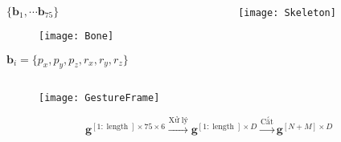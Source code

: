 \begin{frame}
	\begin{columns}
		\begin{column}{0.6\textwidth}
			\centering
			{\Large
			$\{ \mathbf{b}_1, \cdots \mathbf{b}_{75} \}$}
			\vspace{10pt}
			
			\begin{figure}[H]
				\centering
				\texttt{[image: Bone]}
			\end{figure}
			
			\vspace{10pt}
			{\Large
				$\mathbf{b}_{i} = \{p_x, p_y, p_z, r_x, r_y, r_z\}$}
		\end{column}
		
		\begin{column}{0.4\textwidth}
			\begin{figure}[h]
				\centering
				\texttt{[image: Skeleton]}
			\end{figure}
		\end{column}
		
	\end{columns}
	
\end{frame}

\begin{frame}
		\begin{figure}[h]
		\centering
		\texttt{[image: GestureFrame]}
	\end{figure}
	
\begin{equation*}
\mathbf{g}^{[1:\operatorname{length}] \times 75 \times 6} \xrightarrow{ \text{Xử lý} }  \mathbf{g}^{[1: \operatorname{length}] \times D} \xrightarrow{ \text{Cắt} } \mathbf{g}^{[N + M] \times D}
\end{equation*}


\end{frame}



